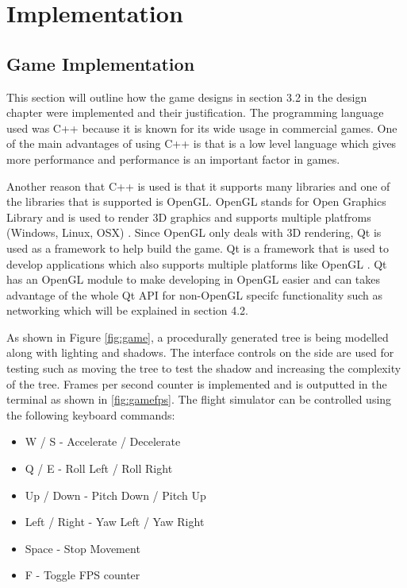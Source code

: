 \chapter{Implementation}
\label{chapter4}

\section{Game Implementation}
This section will outline how the game designs in section 3.2 in the design chapter were implemented and their justification. The programming language used was C++ because it is known for its wide usage in commercial games. One of the main advantages of using C++ is that is a low level language which gives more performance and performance is an important factor in games. 
\newline
\par
Another reason that C++ is used is that it supports many libraries and one of the libraries that is supported is OpenGL. OpenGL stands for Open Graphics Library and is used to render 3D graphics and supports multiple platfroms (Windows, Linux, OSX) \cite{opengl}. Since OpenGL only deals with 3D rendering, Qt is used as a framework to help build the game. Qt is a framework that is used to develop applications which also supports multiple platforms like OpenGL \cite{qt}. Qt has an OpenGL module to make developing in OpenGL easier and can takes advantage of the whole Qt API for non-OpenGL specifc functionality such as networking which will be explained in section 4.2.
\newline
\par
As shown in Figure \ref{fig:game}, a procedurally generated tree is being modelled along with lighting and shadows. The interface controls on the side are used for testing such as moving the tree to test the shadow and increasing the complexity of the tree. Frames per second counter is implemented and is outputted in the terminal as shown in \ref{fig:gamefps}. The flight simulator can be controlled using the following keyboard commands:
\begin{itemize}
 \item W / S		-	Accelerate / Decelerate
 \item Q / E 		-	Roll Left / Roll Right
 \item Up / Down 	-	Pitch Down / Pitch Up
 \item Left / Right	-	Yaw Left / Yaw Right
 \item Space		-	Stop Movement
 \item F 			-	Toggle FPS counter
\end{itemize}

